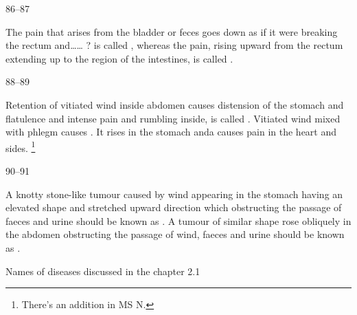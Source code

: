 \begin{translation}
{\item[86--87]

	The pain that arises from the bladder or feces goes down as if it were
	breaking the rectum and…… ? is called , whereas the pain,
	rising upward from the rectum extending up to the region of the
	intestines, is called .

\item[88--89]

	Retention of vitiated wind inside abdomen causes distension of the
	stomach and flatulence and intense pain and rumbling inside, is called
	. Vitiated wind mixed with phlegm causes
	. It rises in the stomach anda causes pain in the heart
	and sides. \footnote{There’s an addition in MS N. }

\item[90--91]

	A knotty stone-like tumour caused by wind appearing in the stomach
	having an elevated shape and stretched upward direction which
	obstructing the passage of faeces and urine should be known as
	. A tumour of similar shape rose obliquely in the abdomen
	obstructing the passage of wind, faeces and urine should be known as
	. 


	Names of diseases discussed in the chapter 2.1

	   
	 
	 
	   



}
\end{translation}
